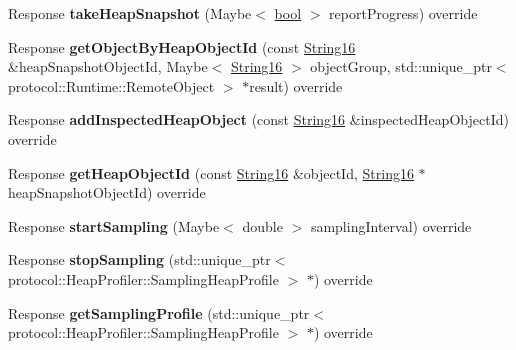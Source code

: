 \begin{DoxyCompactItemize}
\mbox{\label{classv8__inspector_1_1V8HeapProfilerAgentImpl_a1c20f28df8f8301309004c06f998b438}} 
Response {\bfseries take\+Heap\+Snapshot} (Maybe$<$ \mbox{\hyperlink{classbool}{bool}} $>$ report\+Progress) override
\item 
\mbox{\label{classv8__inspector_1_1V8HeapProfilerAgentImpl_af1c26e7686a6c78794178c1a39665b4b}} 
Response {\bfseries get\+Object\+By\+Heap\+Object\+Id} (const \mbox{\hyperlink{classv8__inspector_1_1String16}{String16}} \&heap\+Snapshot\+Object\+Id, Maybe$<$ \mbox{\hyperlink{classv8__inspector_1_1String16}{String16}} $>$ object\+Group, std\+::unique\+\_\+ptr$<$ protocol\+::\+Runtime\+::\+Remote\+Object $>$ $\ast$result) override
\item 
\mbox{\label{classv8__inspector_1_1V8HeapProfilerAgentImpl_aabeaac4ea6b5c4a098b61fa3ab5c20bf}} 
Response {\bfseries add\+Inspected\+Heap\+Object} (const \mbox{\hyperlink{classv8__inspector_1_1String16}{String16}} \&inspected\+Heap\+Object\+Id) override
\item 
\mbox{\label{classv8__inspector_1_1V8HeapProfilerAgentImpl_a5a5ae8b52be8c63ed16c952c769a81d9}} 
Response {\bfseries get\+Heap\+Object\+Id} (const \mbox{\hyperlink{classv8__inspector_1_1String16}{String16}} \&object\+Id, \mbox{\hyperlink{classv8__inspector_1_1String16}{String16}} $\ast$heap\+Snapshot\+Object\+Id) override
\item 
\mbox{\label{classv8__inspector_1_1V8HeapProfilerAgentImpl_a5de7434b9aa3834fa4fea57de4ca13e3}} 
Response {\bfseries start\+Sampling} (Maybe$<$ double $>$ sampling\+Interval) override
\item 
\mbox{\label{classv8__inspector_1_1V8HeapProfilerAgentImpl_afb840b1f8f72ce4c3aef372e8751f4d6}} 
Response {\bfseries stop\+Sampling} (std\+::unique\+\_\+ptr$<$ protocol\+::\+Heap\+Profiler\+::\+Sampling\+Heap\+Profile $>$ $\ast$) override
\item 
\mbox{\label{classv8__inspector_1_1V8HeapProfilerAgentImpl_ae48622c1b6564851cab5298aa5d25252}} 
Response {\bfseries get\+Sampling\+Profile} (std\+::unique\+\_\+ptr$<$ protocol\+::\+Heap\+Profiler\+::\+Sampling\+Heap\+Profile $>$ $\ast$) override
\end{DoxyCompactItemize}


